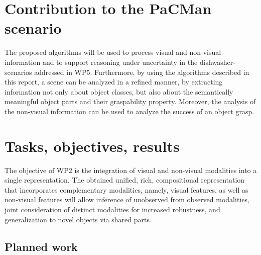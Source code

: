 \documentclass[a4paper,11pt,pdf]{pacmanreport}
\begin{document}
\section*{Contribution to the PaCMan scenario}

The proposed algorithms will be used to process visual and non-visual information and to support reasoning under uncertainty in the dishwasher-scenarios addressed in WP5. Furthermore, by using the algorithms described in this report, a scene can be analyzed in a refined manner, by extracting information not only about object classes, but also about the semantically meaningful object parts and their graspability property. Moreover, the analysis of the non-visual information can be used to analyze the success of an object grasp.

\newpage

\section{Tasks, objectives, results}

The objective of WP2 is the integration of visual and non-visual modalities into a single representation. The obtained unified, rich, compositional representation that incorporates complementary modalities, namely, visual features, as well as non-visual features will allow inference of unobserved from observed modalities, joint consideration of distinct modalities for increased robustness, and generalization to novel objects via shared parts.

\subsection{Planned work}
\end{document}

